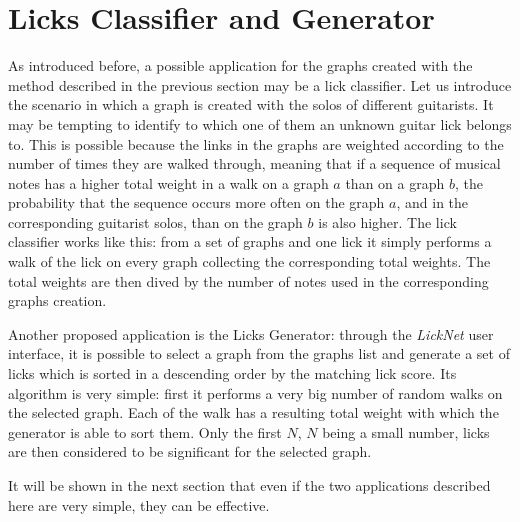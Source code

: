 \documentclass{llncs}
\begin{document}
\section{Licks Classifier and Generator}
As introduced before, a possible application for the graphs created with
the method described in the previous section may be a lick classifier.
Let us introduce the scenario in which a graph is created with the solos
of different guitarists. It may be tempting to identify to which one of them an unknown
guitar lick belongs to. This is possible because the links in the
graphs are weighted according to the number of times they are walked
through, meaning that if a sequence of musical notes has a higher 
total weight in a walk on a graph $a$ than on a graph $b$, the probability that the sequence 
occurs more often on the graph $a$, and in the
corresponding guitarist solos, than on the graph $b$ is also higher.
The lick classifier works like this: from a set of graphs and one
lick it simply performs a walk of the lick on every graph collecting the
corresponding total weights. The total weights are then dived by the
number of notes used in the corresponding graphs creation.

Another proposed application is the Licks Generator: through the
\emph{LickNet} user
interface, it is possible to select a graph from the graphs list and
generate a set of licks which is sorted in a descending order by
the matching lick score. Its algorithm is very simple: first it
performs a very big number of random walks on the selected graph. Each
of the walk has a resulting total weight with which the generator is
able to sort them. Only the first $N$, $N$ being a small number, 
licks are then considered to be significant for the selected graph.

It will be shown in the next section that even if the two applications
described here are very simple, they can be effective.
\end{document}
